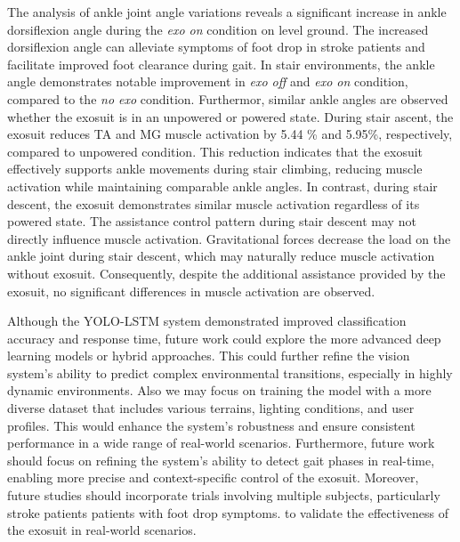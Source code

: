 \documentclass[journal,article,submit,pdftex,moreauthors]{Definitions/mdpi}
\begin{document}
The analysis of ankle joint angle variations reveals a significant increase in ankle dorsiflexion angle during the \textit{exo on} condition on level ground. The increased dorsiflexion angle can alleviate symptoms of foot drop in stroke patients and facilitate improved foot clearance during gait.
In stair environments, the ankle angle demonstrates notable improvement in \textit{exo off} and \textit{exo on} condition, compared to the \textit{no exo} condition. Furthermor, similar ankle angles are observed whether the exosuit is in an unpowered or powered state. During stair ascent, the exosuit reduces TA and MG muscle activation by 5.44 \% and 5.95\%, respectively, compared to unpowered condition. This reduction indicates that the exosuit effectively supports ankle movements during stair climbing, reducing muscle activation while maintaining comparable ankle angles. In contrast, during stair descent, the exosuit demonstrates similar muscle activation regardless of its powered state. %
The assistance control pattern during stair descent may not directly influence muscle activation. Gravitational forces decrease the load on the ankle joint during stair descent, which may naturally reduce muscle activation without exosuit. Consequently, despite the additional assistance provided by the exosuit, no significant differences in muscle activation are observed.

Although the YOLO-LSTM system demonstrated improved classification accuracy and response time, future work could explore the more advanced deep learning models or hybrid approaches. This could further refine the vision system's ability to predict complex environmental transitions, especially in highly dynamic environments. Also we may focus on training the model with a more diverse dataset that includes various terrains, lighting conditions, and user profiles. This would enhance the system’s robustness and ensure consistent performance in a wide range of real-world scenarios. Furthermore, future work should focus on refining the system's ability to detect gait phases in real-time, enabling more precise and context-specific control of the exosuit. Moreover, future studies should incorporate trials involving multiple subjects, particularly stroke patients patients with foot drop symptoms. to validate the effectiveness of the exosuit in real-world scenarios.
\end{document}
